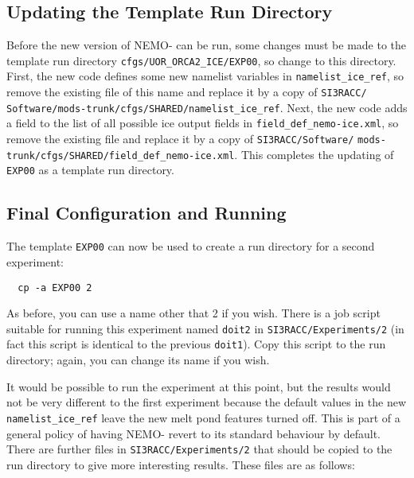 \subsection{Updating the Template Run Directory}
\label{sec:mods:subsec:run-directory}

Before the new version of NEMO-\SIcu{} can be run, some changes must be made to the template run directory \verb|cfgs/UOR_ORCA2_ICE/EXP00|, so change to this directory.
First, the new code defines some new namelist variables in \verb|namelist_ice_|\linebreak\verb|ref|, so remove the existing file of this name and replace it by a copy of \verb|SI3RACC/| \verb|Software/mods-trunk/cfgs/SHARED/namelist_ice_ref|.
Next, the new code adds a field to the list of all possible ice output fields in \verb|field_def_nemo-ice.|\linebreak\verb|xml|, so remove the existing file and replace it by a copy of \verb|SI3RACC/Software/| \verb|mods-trunk/cfgs/SHARED/field_def_nemo-ice.xml|.
This completes the updating of \verb|EXP00| as a template run directory.

\subsection{Final Configuration and Running}
\label{sec:mods:subsec:running}

The template \verb|EXP00| can now be used to create a run directory for a second experiment:

\begin{verbatim}
  cp -a EXP00 2
\end{verbatim}

\noindent{}As before, you can use a name other that 2 if you wish.
There is a job script suitable for running this experiment named \verb|doit2| in \verb|SI3RACC/Experiments/2| (in fact this script is identical to the previous \verb|doit1|).
Copy this script to the run directory; again, you can change its name if you wish.

It would be possible to run the experiment at this point, but the results would not be very different to the first experiment because the default values in the new \verb|namelist_ice_ref| leave the new melt pond features turned off.
This is part of a general policy of having NEMO-\SIcu{} revert to its standard behaviour by default.
There are further files in \verb|SI3RACC/Experiments/2| that should be copied to the run directory to give more interesting results. These files are as follows:

